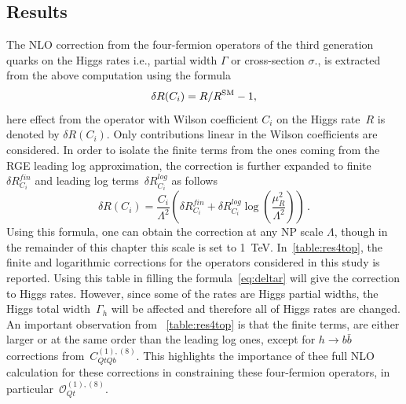 \subsection{Results}
The NLO correction from the four-fermion operators of the third generation quarks on the Higgs rates i.e.,  partial width $\Gamma$ or cross-section $\sigma$., is extracted from the above computation using the formula
\begin{equation}
	\delta R(C_i) = R/R^{\mathrm{SM}} -1,
	\label{eq:deltaR}
\end{equation}
here effect from the operator with Wilson coefficient $C_i$ on the Higgs rate~$R$ is denoted by $\delta R(C_i) $.  Only contributions linear in the Wilson coefficients are considered. In order to isolate the finite terms from the ones coming from the RGE leading log approximation, the correction is further expanded to finite ~$\delta R_{C_i}^{fin}$ and leading log terms~$\delta R_{C_i}^{log}$ as follows
\begin{equation}
	\delta R(C_i)= \frac{C_i}{\Lambda^2}\left(\delta R_{C_i}^{fin}+ \delta R_{C_i}^{log} \log\left(\frac{\mu_R^2}{\Lambda^2}\right)\right)\,.
	\label{eq:deltar}
\end{equation}
%
Using this formula, one can obtain the correction at any NP scale $\Lambda$, though in the remainder of this chapter this scale is set to \SI{1}{TeV}. In~\autoref{table:res4top}, the finite and logarithmic corrections for the operators considered in this study is reported. Using this table in filling the formula~\eqref{eq:deltar} will give the correction to Higgs rates.  However, since some of the rates are Higgs partial widths, the Higgs total width~$\Gamma_h$ will be affected and therefore all of Higgs rates are changed.
%
An important observation from ~\autoref{table:res4top} is that the finite terms, are either larger or at the same order than the leading log ones, except for $h\to b\bar{b}$ corrections from~$C_{QtQb}^{(1),(8)}$. This highlights the importance of thee full NLO calculation for these corrections in constraining these four-fermion operators, in particular~$\mathcal O_{Qt}^{(1),(8)}$. 

